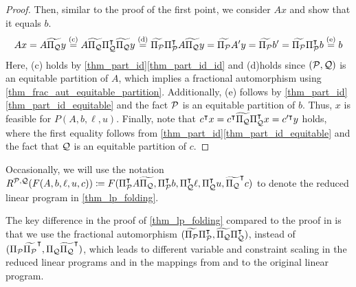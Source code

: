 \documentclass[pdflatex,sn-mathphys-num]{sn-jnl}%
\theoremstyle{thmstyleone}%
\theoremstyle{thmstylethree}%
\theoremstyle{thmstyletwo}%
\begin{document}
\begin{proof}
    Then, similar to the proof of the first point, we consider $Ax$ and show that it equals $b$.
    \begin{equation*}
        A x = A \widetilde{\Pi_{\mathcal{Q}}} y \stackrel{\textup{(c)}}{=} A \widetilde{\Pi_{\mathcal{Q}}} \Pi_{\mathcal{Q}}^{\intercal} \widetilde{\Pi_{\mathcal{Q}}} y \stackrel{\textup{(d)}}{=} \widetilde{\Pi_{\mathcal{P}}} \Pi_{\mathcal{P}}^{\intercal} A  \widetilde{\Pi_{\mathcal{Q}}} y = \widetilde{\Pi_{\mathcal{P}}} A' y = \widetilde{\Pi_{\mathcal{P}}} b' = \widetilde{\Pi_{\mathcal{P}}} \Pi_{\mathcal{P}}^{\intercal} b \stackrel{\textup{(e)}}{=} b 
    \end{equation*}
    Here, \textup{(c)} holds by \cref{thm_part_id}\ref{thm_part_id_id} and \textup{(d)}holds since $(\mathcal{P},\mathcal{Q})$ is an equitable partition of $A$, which implies a fractional automorphism using \cref{thm_frac_aut_equitable_partition}. Additionally, \textup{(e)} follows by \cref{thm_part_id}\ref{thm_part_id_equitable} and the fact $\mathcal{P}$ is an equitable partition of $b$. Thus, $x$ is feasible for $P(A,b,\ell,u)$. 
    Finally, note that $c^{\intercal} x = c^{\intercal} \widetilde{\Pi_{\mathcal{Q}}} \Pi_{\mathcal{Q}}^{\intercal} x = c'^{\intercal} y$ holds, where the first equality follows from \cref{thm_part_id}\ref{thm_part_id_equitable} and the fact that $\mathcal{Q}$ is an equitable partition of $c$. 
\end{proof}

Occasionally, we will use the notation
$R^{\MP,\MQ}(F(A,b,\ell,u,c)) \coloneqq F(\transpose{\Pi_{\MP}} A \widetilde{\Pi_\MQ}, \transpose{\Pi_{\MP}} b, \transpose{\Pi_{\MQ}} \ell, \transpose{\Pi_{\MQ}} u, 
\transpose{\widetilde{\Pi_{\MQ}}} c)$
to denote the reduced linear program in \cref{thm_lp_folding}.

The key difference in the proof of \cref{thm_lp_folding} compared to the proof in \cite[Lemma 7.1]{Grohe2014} is that we use the fractional automorphism $(\widetilde{\Pi_{\mathcal{P}}} \Pi_{\mathcal{P}}^{\intercal}, \widetilde{\Pi_{\mathcal{Q}}} \Pi_{\mathcal{Q}}^{\intercal})$, instead of $({\Pi_{\mathcal{P}}} \widetilde{\Pi_{\mathcal{P}}}^{\intercal}, {\Pi_{\mathcal{Q}}} \widetilde{\Pi_{\mathcal{Q}}}^{\intercal})$, which leads to different variable and constraint scaling in the reduced linear programs and in the mappings from and to the original linear program. 
\end{document}
